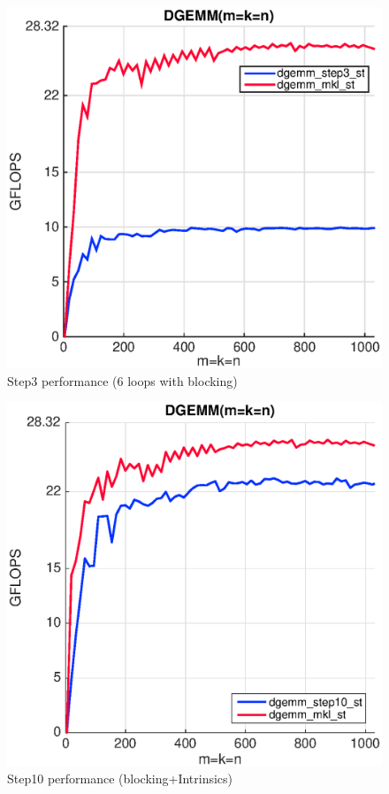 \begin{figure}[!htp]
  \centering
  \includegraphics[scale=.5]{figures/step3_single_thread_ivy.eps}
  \caption{Step3 performance (6 loops with blocking)}
  \label{fig:packing}
\end{figure} 

\begin{figure}[!htp]
  \centering
  \includegraphics[scale=.5]{figures/step10_single_thread_ivy.eps}
  \caption{Step10 performance (blocking+Intrinsics)}
  \label{fig:int}
\end{figure} 

